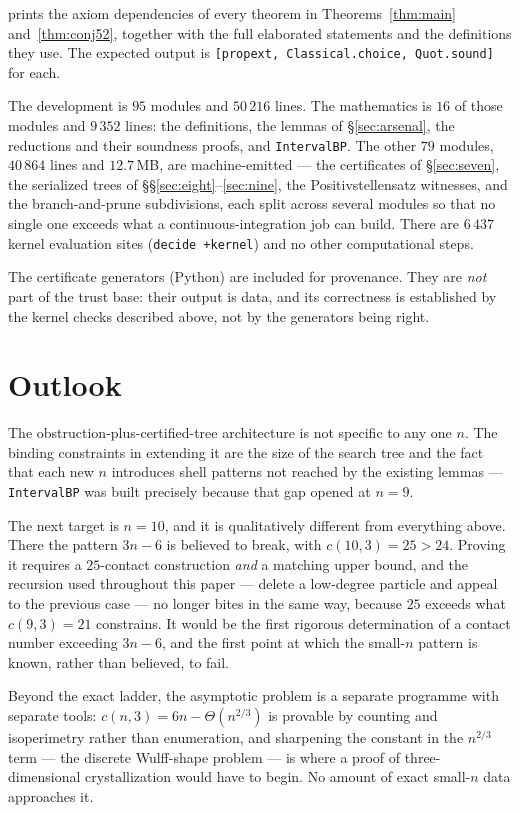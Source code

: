 \documentclass[11pt,a4paper]{article}
\theoremstyle{plain}
\theoremstyle{definition}
\begin{document}
\noindent prints the axiom dependencies of every theorem in Theorems~\ref{thm:main}
and~\ref{thm:conj52}, together with the full elaborated statements and the definitions
they use. The expected output is \texttt{[propext, Classical.choice, Quot.sound]} for
each.

The development is $95$ modules and $50\,216$ lines. The mathematics is $16$ of those
modules and $9\,352$ lines: the definitions, the lemmas of \S\ref{sec:arsenal}, the
reductions and their soundness proofs, and \texttt{IntervalBP}. The other $79$ modules,
$40\,864$ lines and $12.7$\,MB, are machine-emitted --- the certificates of
\S\ref{sec:seven}, the serialized trees of \S\S\ref{sec:eight}--\ref{sec:nine}, the
Positivstellensatz witnesses, and the branch-and-prune subdivisions, each split across
several modules so that no single one exceeds what a continuous-integration job can
build. There are $6\,437$ kernel evaluation sites (\texttt{decide +kernel}) and no other
computational steps.

The certificate generators (Python) are included for provenance. They are \emph{not}
part of the trust base: their output is data, and its correctness is established by the
kernel checks described above, not by the generators being right.

\section{Outlook}
\label{sec:outlook}

The obstruction-plus-certified-tree architecture is not specific to any one $n$. The
binding constraints in extending it are the size of the search tree and the fact that
each new $n$ introduces shell patterns not reached by the existing lemmas ---
\texttt{IntervalBP} was built precisely because that gap opened at $n=9$.

The next target is $n = 10$, and it is qualitatively different from everything above.
There the pattern $3n-6$ is believed to break, with $c(10,3) = 25 > 24$. Proving it
requires a $25$-contact construction \emph{and} a matching upper bound, and the
recursion used throughout this paper --- delete a low-degree particle and appeal to the
previous case --- no longer bites in the same way, because $25$ exceeds what
$c(9,3) = 21$ constrains. It would be the first rigorous determination of a contact
number exceeding $3n-6$, and the first point at which the small-$n$ pattern is known,
rather than believed, to fail.

Beyond the exact ladder, the asymptotic problem is a separate programme with separate
tools: $c(n,3) = 6n - \Theta(n^{2/3})$ is provable by counting and isoperimetry rather
than enumeration, and sharpening the constant in the $n^{2/3}$ term --- the discrete
Wulff-shape problem --- is where a proof of three-dimensional crystallization would
have to begin. No amount of exact small-$n$ data approaches it.
\end{document}
